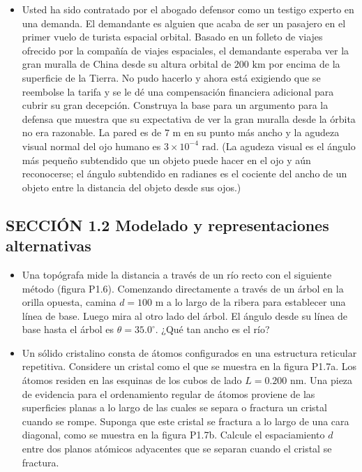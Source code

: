 \documentclass[11pt,a4paper]{article}
\begin{document}
\begin{itemize}
    \item[\textbf{5.}] Usted ha sido contratado por el abogado defensor como un testigo experto en una demanda. El demandante es alguien que acaba de ser un pasajero en el primer vuelo de turista espacial orbital. Basado en un folleto de viajes ofrecido por la compañía de viajes espaciales, el demandante esperaba ver la gran muralla de China desde su altura orbital de $200 \text{ km}$ por encima de la superficie de la Tierra. No pudo hacerlo y ahora está exigiendo que se reembolse la tarifa y se le dé una compensación financiera adicional para cubrir su gran decepción. Construya la base para un argumento para la defensa que muestra que su expectativa de ver la gran muralla desde la órbita no era razonable. La pared es de $7 \text{ m}$ en su punto más ancho y la agudeza visual normal del ojo humano es $3 \times 10^{-4} \text{ rad}$. (La agudeza visual es el ángulo más pequeño subtendido que un objeto puede hacer en el ojo y aún reconocerse; el ángulo subtendido en radianes es el cociente del ancho de un objeto entre la distancia del objeto desde sus ojos.)
    \vspace*{8cm}
\end{itemize}

\newpage

\subsection*{SECCIÓN 1.2 Modelado y representaciones alternativas}

\begin{itemize}
    \item[\textbf{6.}] Una topógrafa mide la distancia a través de un río recto con el siguiente método (figura P1.6). Comenzando directamente a través de un árbol en la orilla opuesta, camina $d = 100 \text{ m}$ a lo largo de la ribera para establecer una línea de base. Luego mira al otro lado del árbol. El ángulo desde su línea de base hasta el árbol es $\theta = 35.0^\circ$. ¿Qué tan ancho es el río?
    \vspace*{6cm}
    
    \item[\textbf{7.}] Un sólido cristalino consta de átomos configurados en una estructura reticular repetitiva. Considere un cristal como el que se muestra en la figura P1.7a. Los átomos residen en las esquinas de los cubos de lado $L = 0.200 \text{ nm}$. Una pieza de evidencia para el ordenamiento regular de átomos proviene de las superficies planas a lo largo de las cuales se separa o fractura un cristal cuando se rompe. Suponga que este cristal se fractura a lo largo de una cara diagonal, como se muestra en la figura P1.7b. Calcule el espaciamiento $d$ entre dos planos atómicos adyacentes que se separan cuando el cristal se fractura.
    \vspace*{7cm}
\end{itemize}
\end{document}
